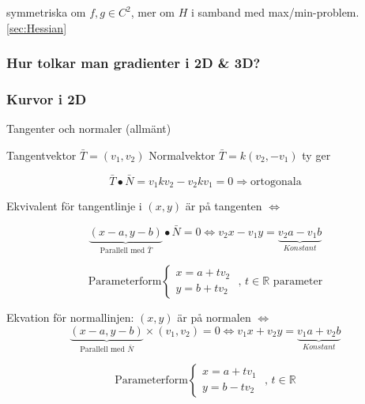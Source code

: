 \documentclass[a4paper]{article}
\begin{document}
symmetriska om \(f,g \in C^2\), \newline mer om \(H\) i samband med max/min-problem. \vref{sec:Hessian}

\subsubsection{Hur tolkar man gradienter i 2D \& 3D?}

\subsubsection*{Kurvor i 2D}

Tangenter och normaler (allmänt)

Tangentvektor \(\bar{T} = (v_1,v_2)\) \newline
Normalvektor \(\bar{T} = k(v_2,-v_1)\) ty ger \newline

\[\bar{T} \bullet \bar{N} = v_1kv_2 - v_2kv_1 = 0 \Rightarrow \text{ortogonala}\]

Ekvivalent för tangentlinje i \((x,y)\) är på tangenten \(\iff\) \newline

\[\underbrace{(x-a,y-b)}_{\text{Parallell med }\bar{T}} \bullet \bar{N} = 0 \iff v_2x - v_1y = \underbrace{v_2a - v_1b}_{Konstant}\]

\[
	\text{Parameterform} 
	\left\{\begin{array}{rcl}
		x=a+tv_2 \\
		y=b+tv_2
	\end{array}\right.
	\text{ , } t \in \mathbb{R} \text{ parameter}
\]

Ekvation för normallinjen: \((x,y)\) är på normalen \(\iff\)
\[
	\underbrace{(x-a,y-b)}_{\text{Parallell med }\bar{N}} \times (v_1,v_2) = 0 \iff v_1x + v_2y = \underbrace{v_1a + v_2b}_{Konstant}
\]

\[
	\text{Parameterform} 
	\left\{\begin{array}{rcl}
		x=a+tv_1 \\
		y=b-tv_2
	\end{array}\right.
	\text{ , } t \in \mathbb{R}
\]
\end{document}
